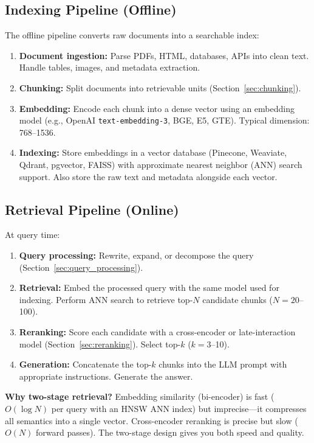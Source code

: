 \subsection{Indexing Pipeline (Offline)}

The offline pipeline converts raw documents into a searchable index:

\begin{enumerate}
    \item \textbf{Document ingestion:} Parse PDFs, HTML, databases, APIs into clean text. Handle tables, images, and metadata extraction.
    \item \textbf{Chunking:} Split documents into retrievable units (Section~\ref{sec:chunking}).
    \item \textbf{Embedding:} Encode each chunk into a dense vector using an embedding model (e.g., OpenAI \texttt{text-embedding-3}, BGE, E5, GTE). Typical dimension: 768--1536.
    \item \textbf{Indexing:} Store embeddings in a vector database (Pinecone, Weaviate, Qdrant, pgvector, FAISS) with approximate nearest neighbor (ANN) search support. Also store the raw text and metadata alongside each vector.
\end{enumerate}

\subsection{Retrieval Pipeline (Online)}

At query time:
\begin{enumerate}
    \item \textbf{Query processing:} Rewrite, expand, or decompose the query (Section~\ref{sec:query_processing}).
    \item \textbf{Retrieval:} Embed the processed query with the same model used for indexing. Perform ANN search to retrieve top-$N$ candidate chunks ($N = 20$--100).
    \item \textbf{Reranking:} Score each candidate with a cross-encoder or late-interaction model (Section~\ref{sec:reranking}). Select top-$k$ ($k = 3$--10).
    \item \textbf{Generation:} Concatenate the top-$k$ chunks into the LLM prompt with appropriate instructions. Generate the answer.
\end{enumerate}

\textbf{Why two-stage retrieval?} Embedding similarity (bi-encoder) is fast ($O(\log N)$ per query with an HNSW ANN index) but imprecise---it compresses all semantics into a single vector. Cross-encoder reranking is precise but slow ($O(N)$ forward passes). The two-stage design gives you both speed and quality.

